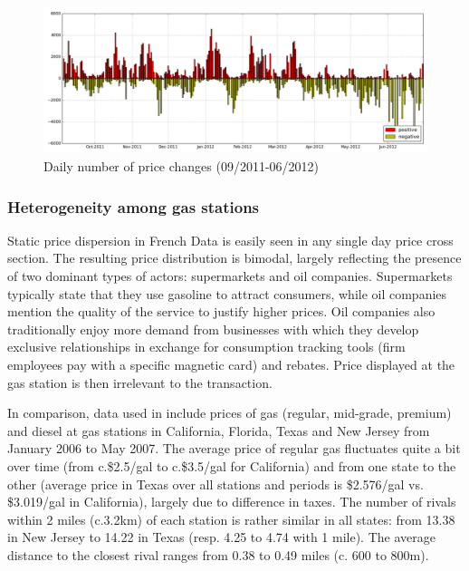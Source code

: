 \documentclass[11pt]{article}
\begin{document}
\begin{figure}[!h]
    \caption{Daily number of price changes (09/2011-06/2012)}
	\centering
		\includegraphics[width=16cm]{graphs/diesel_nb_price_chges.png}
\end{figure}

\subsubsection{Heterogeneity among gas stations}

Static price dispersion in French Data is easily seen in any single day price cross section. The resulting price distribution is bimodal, largely reflecting the presence of two dominant types of actors: supermarkets and oil companies. Supermarkets typically state that they use gasoline to attract consumers, while oil companies mention the quality of the service to justify higher prices. Oil companies also traditionally enjoy more demand from businesses with which they develop exclusive relationships in exchange for consumption tracking tools (firm employees pay with a specific magnetic card) and rebates. Price displayed at the gas station is then irrelevant to the transaction.

In comparison, data used in \cite{TAP11} include prices of gas (regular, mid-grade, premium) and diesel at gas stations in California, Florida, Texas and New Jersey from January 2006 to May 2007. The average price of regular gas fluctuates quite a bit over time (from c.\$2.5/gal to c.\$3.5/gal for California) and from one state to the other (average price in Texas over all stations and periods is \$2.576/gal vs. \$3.019/gal in California), largely due to difference in taxes. The number of rivals within 2 miles (c.3.2km) of each station is rather similar in all states: from 13.38 in New Jersey to 14.22 in Texas (resp. 4.25 to 4.74 with 1 mile). The average distance to the closest rival ranges from 0.38 to 0.49 miles (c. 600 to 800m).
\end{document}
